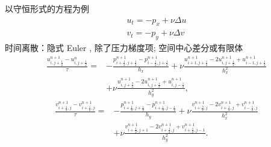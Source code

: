 \documentclass[12pt]{article}
\begin{document}
以守恒形式的方程为例
\begin{equation}
	\begin{aligned}
		u_{t}=-p_{x}+\nu \Delta u \\
		v_{t}=-p_{y}+\nu \Delta v
	\end{aligned}
\end{equation}
时间离散：隐式 Euler , 除了压力梯度项; 空间中心差分或有限体
\begin{equation}
	\begin{aligned}
		\frac{u_{i, j+\frac{1}{2}}^{n+1}-u_{i, j+\frac{1}{2}}^{n}}{\tau} = & -\frac{p_{i+\frac{1}{2}, j+\frac{1}{2}}^{n+1}-p_{i-\frac{1}{2}, j+\frac{1}{2}}^{n+1}}{h_{x}}+\nu \frac{u_{i+1, j+\frac{1}{2}}^{n+1}-2 u_{i, j+\frac{1}{2}}^{n+1}+u_{i-1, j+\frac{1}{2}}^{n+1}}{h_{x}^{2}} \\
		                                                                   & +\nu \frac{u_{i, j+\frac{3}{2}}^{n+1}-2 u_{i, j+\frac{1}{2}}^{n+1}+u_{i, j-\frac{1}{2}}^{n+1}}{h_{y}^{2}},
	\end{aligned}
	\label{eq:C2u}
\end{equation}
\begin{equation}
	\begin{aligned}
		\frac{v_{i+\frac{1}{2}, j}^{n+1}-v_{i+\frac{1}{2}, j}^{n+1}}{\tau} = & -\frac{p^{n+1}_{i+\frac{1}{2}, j+\frac{1}{2}}-p_{i+\frac{1}{2}, j-\frac{1}{2}}^{n+1}}{h_{y}}+\nu \frac{v_{i+\frac{3}{2}, j}^{n+1}-2 v_{i+\frac{1}{2}, j}^{n+1}+v_{i-\frac{1}{2}, j}^{n+1}}{h_{x}^{2}} \\
		                                                                     & +\nu \frac{v_{i+\frac{1}{2}, j+1}^{n+1}-2 v_{i+\frac{1}{2}, j}^{n+1}+v_{i+\frac{1}{2}, j-1}^{n+1}}{h_{y}^{2}}.
	\end{aligned}
	\label{eq:C2v}
\end{equation}
\end{document}
